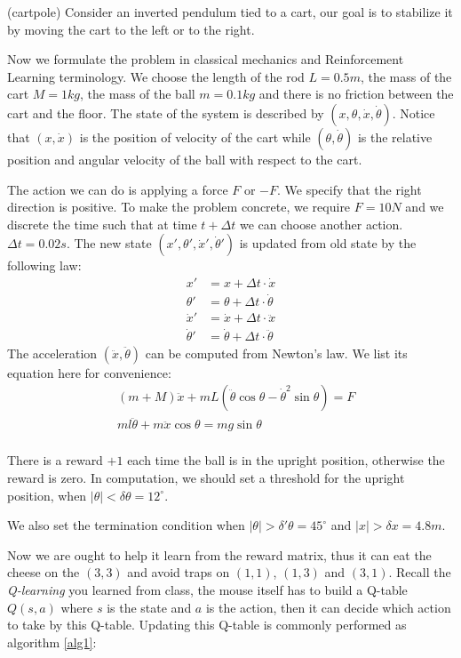 \documentclass{article}
\begin{document}
(cartpole) Consider an inverted pendulum tied to a cart, our goal is to stabilize it by moving the cart
to the left or to the right.

Now we formulate the problem in classical mechanics and Reinforcement Learning terminology.
We choose the length of the rod $L = 0.5 m$, the mass of the cart $M=1 kg$, the mass of the ball $m=0.1 kg$
and there is no friction between the cart and the floor.
The state of the system is described by
$(x, \theta, \dot{x}, \dot{\theta})$. Notice that $(x, \dot{x})$ is the position of velocity of the cart while
$(\theta, \dot{\theta})$ is the relative position and angular velocity of the ball with respect to the cart.

The action we can do is applying a force
$F$ or $-F$. We specify that the right direction is positive. To make the problem concrete,
we require $F=10N$ and we discrete the time such that at time $t+\Delta t$ we can choose another action.
$\Delta t = 0.02s$. The new state $(x', \theta', \dot{x}', \dot{\theta}')$ is updated from old state by the following law:
\begin{align*}
x' &= x + \Delta t \cdot \dot{x} \\
\theta' &= \theta + \Delta t \cdot \dot{\theta} \\
\dot{x}' &= \dot{x} + \Delta t \cdot \ddot{x} \\
\dot{\theta}' &= \dot{\theta} + \Delta t \cdot \ddot{\theta}
\end{align*}
The acceleration $(\ddot{x}, \ddot{\theta})$ can be computed from Newton's law.
We list its equation here for convenience:
\begin{align*}
& (m + M)\ddot{x} + mL(\ddot{\theta} \cos \theta - \dot{\theta}^2 \sin \theta) = F \\
& m l \ddot{\theta} + m \ddot{x} \cos\theta = m g \sin \theta \\
\end{align*}

There is a reward $+1$ each time the ball is in the upright position, otherwise the reward is zero.
In computation, we should set a threshold for the upright position, when $|\theta|< \delta \theta = 12^\circ$.

We also set the termination condition when $|\theta| > \delta' \theta = 45^\circ$ and $|x| > \delta x = 4.8 m $.

Now we are ought to help it learn from the reward matrix, thus it can eat the cheese on the $(3,3)$ and avoid traps on $(1,1)$, $(1,3)$ and $(3,1)$. Recall the \emph{Q-learning} you learned from class, the mouse itself has to build a Q-table $Q(s,a)$ where $s$ is the state and $a$ is the action, then it can decide which action to take by this Q-table. Updating this Q-table is commonly performed as algorithm \ref{alg1}:
\end{document}
